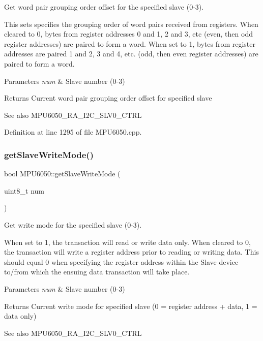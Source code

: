 Get word pair grouping order offset for the specified slave (0-\/3). 

This sets specifies the grouping order of word pairs received from registers. When cleared to 0, bytes from register addresses 0 and 1, 2 and 3, etc (even, then odd register addresses) are paired to form a word. When set to 1, bytes from register addresses are paired 1 and 2, 3 and 4, etc. (odd, then even register addresses) are paired to form a word.


\begin{DoxyParams}{Parameters}
{\em num} & Slave number (0-\/3) \\
\hline
\end{DoxyParams}
\begin{DoxyReturn}{Returns}
Current word pair grouping order offset for specified slave 
\end{DoxyReturn}
\begin{DoxySeeAlso}{See also}
M\+P\+U6050\+\_\+\+R\+A\+\_\+\+I2\+C\+\_\+\+S\+L\+V0\+\_\+\+C\+T\+RL 
\end{DoxySeeAlso}


Definition at line 1295 of file M\+P\+U6050.\+cpp.

\mbox{\label{classMPU6050_adb99955fa66300b1f0bedfcdd8187412}} 
\subsubsection{\texorpdfstring{getSlaveWriteMode()}{getSlaveWriteMode()}}
{\footnotesize\ttfamily bool M\+P\+U6050\+::get\+Slave\+Write\+Mode (\begin{DoxyParamCaption}\item[{uint8\+\_\+t}]{num }\end{DoxyParamCaption})}



Get write mode for the specified slave (0-\/3). 

When set to 1, the transaction will read or write data only. When cleared to 0, the transaction will write a register address prior to reading or writing data. This should equal 0 when specifying the register address within the Slave device to/from which the ensuing data transaction will take place.


\begin{DoxyParams}{Parameters}
{\em num} & Slave number (0-\/3) \\
\hline
\end{DoxyParams}
\begin{DoxyReturn}{Returns}
Current write mode for specified slave (0 = register address + data, 1 = data only) 
\end{DoxyReturn}
\begin{DoxySeeAlso}{See also}
M\+P\+U6050\+\_\+\+R\+A\+\_\+\+I2\+C\+\_\+\+S\+L\+V0\+\_\+\+C\+T\+RL 
\end{DoxySeeAlso}


